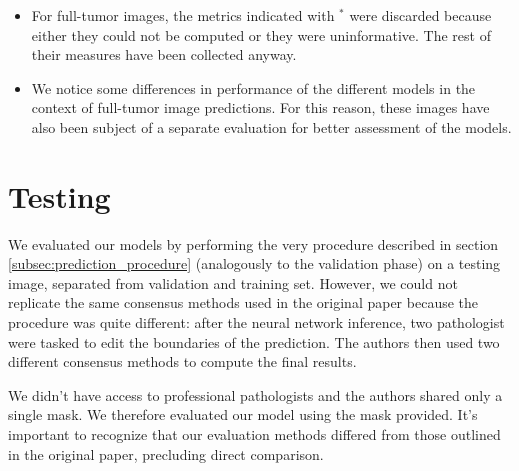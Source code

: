  \subtitle{Remarks}
 \begin{itemize}
     \item For full-tumor images, the metrics indicated with $^*$ were discarded because either they could not be computed or they were uninformative. The rest of their measures have been collected anyway.
     \item We notice some differences in performance of the different models in the context of full-tumor image predictions. For this reason, these images have also been subject of a separate evaluation for better assessment of the models.
 \end{itemize}

\section{Testing}

\par
We evaluated our models by performing the very procedure described in section \ref{subsec:prediction_procedure} (analogously to the validation phase) on a testing image, separated from validation and training set. However, we could not replicate the same consensus methods used in the original paper because the procedure was quite different: after the neural network inference, two pathologist were tasked to edit the boundaries of the prediction. The authors then used two different consensus methods to compute the final results.

\par
We didn't have access to professional pathologists and the authors shared only a single mask. We therefore evaluated our model using the mask provided. It's important to recognize that our evaluation methods differed from those outlined in the original paper, precluding direct comparison.